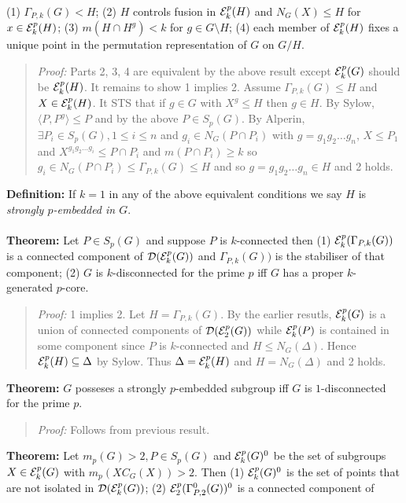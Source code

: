(1) $\Gamma_{P,k}(G)<H$;
(2) $H$ controls fusion in ${\cal E}_k^p(H)$ and $N_G(X) \le H$ for
$x \in {\cal E}_k^p(H)$;
(3) $m(H \cap H^g)<k$ for $g \in G \setminus H$;
(4) each member of
${\cal E}_k^p(H)$ fixes a unique point in the permutation representation of $G$ on $G/H$.
\begin{quote}
\emph{Proof:}  
Parts 2, 3, 4 are equivalent by the above result except
${\cal E}^p_k(G)$ should be
${\cal E}^p_k(H)$.  It remains to show 1 implies 2.
Assume
$\Gamma_{P, k}(G) \le H$ and $X \in {\cal E}^p_k(H)$.  It STS
that if $g \in G$ with $X^g \le H$ then $g \in H$.  By Sylow,
$\langle P, P^g \rangle \le P$ and by the above
$P \in S_p(G)$.  By Alperin, $\exists P_i \in S_p(G), 1 \le i \le n$ and
$g_i \in N_G(P \cap P_i )$ with $g= g_1 g_2 \ldots g_n$, $X \le P_1$
and $X^{g_1 g_2 \ldots g_i} \le P \cap P_i$ and $m(P \cap P_i) \ge k$
so $g_i \in N_G(P \cap P_i) \le
\Gamma_{P, k}(G) \le H $ and so
$g= g_1 g_2 \ldots g_n \in H$ and 2 holds.
\end{quote}
{\bf Definition:}  If $k=1$ in any of the above equivalent conditions we say $H$ is
\emph{strongly $p$-embedded in $G$}.
\\
\\
{\bf Theorem:} 
Let $P \in S_p(G)$ and suppose $P$ is $k$-connected then
(1) ${\cal E}_k^p(\Gamma_{P,k}(G))$ is a connected component of
${\cal D}({\cal E}_k^p(G))$ and
$\Gamma_{P,k}(G))$ is the stabiliser of that component;
(2) $G$ is $k$-disconnected for the prime $p$ iff $G$ has a proper $k$-generated $p$-core.
\begin{quote}
\emph{Proof:}  
1 implies 2.  Let $H= \Gamma_{P, k}(G)$.  By the earlier resutls,
${\cal E}^p_k(G)$
is a union of connected components of
${\cal D}({\cal E}^p_2(G))$
while
${\cal E}^p_k(P)$ is contained in some component since
$P$ is $k$-connected and $H \le N_G( \Delta )$.  Hence
${\cal E}^p_k(H) \subseteq \Delta$ by Sylow. Thus
$\Delta = {\cal E}^p_k(H)$ and $H= N_G( \Delta )$ and 2 holds.
\end{quote}
{\bf Theorem:} 
$G$ posseses a strongly $p$-embedded subgroup iff $G$ is $1$-disconnected for the prime $p$.
\begin{quote}
\emph{Proof:}  
Follows from previous result.
\end{quote}
{\bf Theorem:} 
Let $m_p(G) > 2, P \in S_p(G)$ and
${\cal E}_k^p(G)^0$ be the set of subgroups 
$X \in {\cal E}_k^p(G)$ with $m_p(XC_G(X)) > 2$.  Then
(1) ${\cal E}_k^p(G)^0$ is the set of points that are not isolated in
${\cal D}({\cal E}_k^p(G))$;
(2) ${\cal E}_2^p(\Gamma_{P,2}^0(G))^0$ is a connected component of
